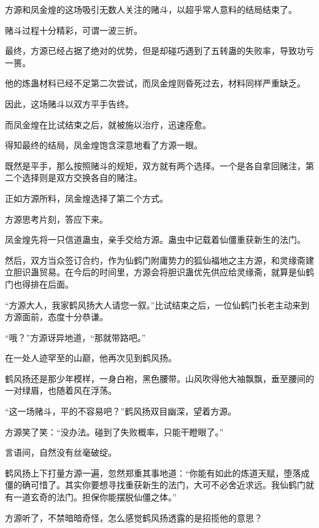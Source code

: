 
\begin{this_body}



方源和凤金煌的这场吸引无数人关注的赌斗，以超乎常人意料的结局结束了。

赌斗过程十分精彩，可谓一波三折。

最终，方源已经占据了绝对的优势，但是却碰巧遇到了五转蛊的失败率，导致功亏一篑。

他的炼蛊材料已经不足第二次尝试，而凤金煌则昏死过去，材料同样严重缺乏。

因此，这场赌斗以双方平手告终。

而凤金煌在比试结束之后，就被施以治疗，迅速痊愈。

得知最终的结局，凤金煌饱含深意地看了方源一眼。

既然是平手，那么按照赌斗的规矩，双方就有两个选择。一个是各自拿回赌注，第二个选择则是双方交换各自的赌注。

正如方源所料，凤金煌选择了第二个方式。

方源思考片刻，答应下来。

凤金煌先将一只信道蛊虫，亲手交给方源。蛊虫中记载着仙僵重获新生的法门。

然后，双方当众签订合约，作为仙鹤门附庸势力的狐仙福地之主方源，和灵缘斋建立胆识蛊贸易。在今后的时间里，方源会将胆识蛊优先供应给灵缘斋，就算是仙鹤门也得排在后面。

“方源大人，我家鹤风扬大人请您一叙。”比试结束之后，一位仙鹤门长老主动来到方源面前，态度十分恭谦。

“哦？”方源讶异地道，“那就带路吧。”

在一处人迹罕至的山巅，他再次见到鹤风扬。

鹤风扬还是那少年模样，一身白袍，黑色腰带。山风吹得他大袖飘飘，垂至腰间的一对绿眉，也随着风在浮荡。

“这一场赌斗，平的不容易吧？”鹤风扬双目幽深，望着方源。

方源笑了笑：“没办法。碰到了失败概率，只能干瞪眼了。”

言语间，自然没有丝毫破绽。

鹤风扬上下打量方源一遍，忽然郑重其事地道：“你能有如此的炼道天赋，堕落成僵的确可惜了。其实你要想寻找重获新生的法门，大可不必舍近求远。我仙鹤门就有一道玄奇的法门。担保你能摆脱仙僵之体。”

方源听了，不禁暗暗奇怪，怎么感觉鹤风扬透露的是招揽他的意思？


\end{this_body}

